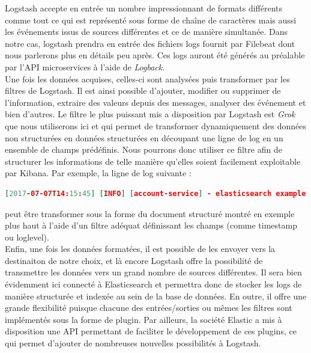 	Logstash accepte en entrée un nombre impressionnant de formats différents comme tout ce qui est représenté sous forme de chaîne de caractères mais aussi les événements issus de sources différentes et ce de manière simultanée. Dans notre cas, logstash prendra en entrée des fichiers logs fournit par Filebeat dont nous parlerons plus en détails peu après. Ces logs auront été générés au préalable par l'API microservices à l'aide de \textit{Logback}. \\
	
	Une fois les données acquises, celles-ci sont analysées puis transformer par les filtres de Logstash. Il est ainsi possible d'ajouter, modifier ou supprimer de l'information, extraire des valeurs depuis des messages, analyser des événement et bien d'autres. Le filtre le plus puissant mis a disposition par Logstash est \textit{Grok} que nous utiliserons ici et qui permet de transformer dynamiquement des données non structurées en données structurées en découpant une ligne de log en un ensemble de champs prédéfinis. Nous pourrons donc utiliser ce filtre afin de structurer les informations de telle manière qu'elles soient facilement exploitable par Kibana. Par exemple, la ligne de log suivante :
	
\begin{lstlisting}[language=json]
 [2017-07-07T14:15:45] [INFO] [account-service] - elasticsearch example
\end{lstlisting}
	
	peut être transformer sous la forme du document structuré montré en exemple plus haut à l'aide d'un filtre adéquat définissant les champs (comme timestamp ou loglevel). \\
	
	Enfin, une fois les données formatées, il est possible de les envoyer vers la destinaiton de notre choix, et là encore Logstash offre la possibilité de transmettre les données vers un grand nombre de sources différentes. Il sera bien évidemment ici connecté à Elasticsearch et permettra donc de stocker les logs de manière structurée et indexée au sein de la base de données. En outre, il offre une grande flexibilité puisque chacune des entrées/sorties ou mêmes les filtres sont implémentés sous la forme de plugin. Par ailleurs, la société Elastic a mis à disposition une API permettant de faciliter le développement de ces plugins, ce qui permet d'ajouter de nombreuses nouvelles possibilités à Logstash.
	
